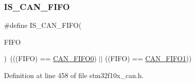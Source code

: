 \subsubsection{\texorpdfstring{I\+S\+\_\+\+C\+A\+N\+\_\+\+F\+I\+FO}{IS\_CAN\_FIFO}}
{\footnotesize\ttfamily \#define I\+S\+\_\+\+C\+A\+N\+\_\+\+F\+I\+FO(\begin{DoxyParamCaption}\item[{}]{F\+I\+FO }\end{DoxyParamCaption})~(((F\+I\+FO) == \hyperlink{group___c_a_n__receive___f_i_f_o__number__constants_ga8f52eeefb86b2af5b7c3b4b75fa4d114}{C\+A\+N\+\_\+\+F\+I\+F\+O0}) $\vert$$\vert$ ((F\+I\+FO) == \hyperlink{group___c_a_n__receive___f_i_f_o__number__constants_gafbcf3f13dbf61030ab7a812595ba9850}{C\+A\+N\+\_\+\+F\+I\+F\+O1}))}



Definition at line 458 of file stm32f10x\+\_\+can.\+h.

